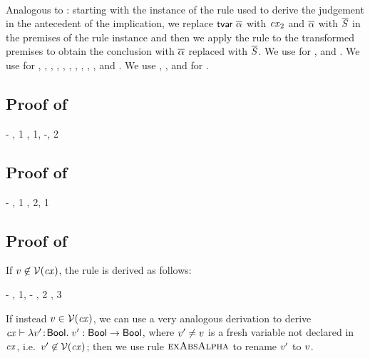 \begin{bycase}
\Case{\restrules}\\
Analogous to \Rtbool: starting with the instance of the rule used to derive
the judgement in the antecedent of the implication, we replace
$\mathsf{tvar}\ \overline{\alpha}$ with $\mathit{cx}_2$ and $\overline{\alpha}$ with $\overline{S}$ in the premises of
the rule instance and then we apply the rule to the transformed premises to
obtain the conclusion with $\overline{\alpha}$ replaced with $\overline{S}$. We use
 for \Rtsub,
and \Rterestr.
We use  for
\Rstrefl, \Rstarr, \Rstrec,
\Reif, \Redesc, \Rthifsbs, \Rthbool, \Rthext, \Rthif, \Rthrec,
and \Rthprojsub.
We use ,
, and  for
\Reabsalpha.

\end{bycase}



\subsection*{Proof of }

\begin{derivation}
\step{\cxwfO}
     {\hyp}
\step{\istyO{\bool}}
     {\Rtbool, 1}
\step{\cxwf{\snoc{\cx}{\vdec{\var}{\bool}}}}
     {\Rcxvdec, 1, \hyp, 2}
\end{derivation}



\subsection*{Proof of }

\begin{derivation}
\step{\hastyO{\expr}{\bool}}
     {\hyp}
\step{\cxwfO}
     {, 1}
\step{\cxwf{\snoc{\cx}{\axM{\expr}}}}
     {\Rcxax, 2, 1}
\end{derivation}



\subsection*{Proof of }

If $v\not\in\mathcal{V}(\mathit{cx})$, the rule is derived as follows:
\begin{derivation}
\step{\cxwfO}
     {\hyp}
\step{\cxwf{\snoc{\cx}{\vdec{\var}{\bool}}}}
     {\Rcxvdecbool, 1, \hyp}
\step{\hasty{\snoc{\cx}{\vdec{\var}{\bool}}}{\var}{\bool}}
     {\Revar, 2}
\step{\hastyO{\abs{\var}{\bool}{\var}}{\tarr{\bool}{\bool}}}
     {\Reabs, 3}
\end{derivation}
If instead $v\in\mathcal{V}(\mathit{cx})$, we can use a very analogous derivation to
derive $\mathit{cx}\vdash\lambda v'\!:\!\mathsf{Bool}.\;v':\mathsf{Bool}\to\mathsf{Bool}$, where
$v'\neq v$ is a fresh variable not declared in $\mathit{cx}$, i.e.\
$v'\not\in\mathcal{V}(\mathit{cx})$; then we use rule $\textsc{exAbsAlpha}$ to rename $v'$ to
$v$.



